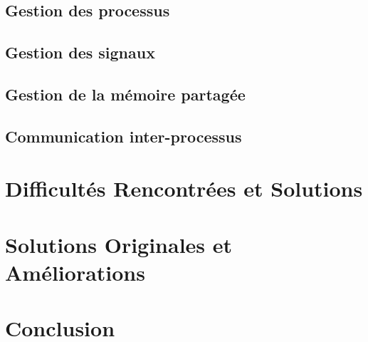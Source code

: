 \documentclass[utf8]{article}
\begin{document}
\subsection{Gestion des processus}
\paragraph{}
\subsection{Gestion des signaux}
\paragraph{}
\subsection{Gestion de la mémoire partagée}
\paragraph{}
\subsection{Communication inter-processus}
\paragraph{}

\section{Difficultés Rencontrées et Solutions}
\subsection{}
\paragraph{}

\section{Solutions Originales et Améliorations}
\subsection{}
\paragraph{}

\section{Conclusion}
\paragraph{}
\end{document}
